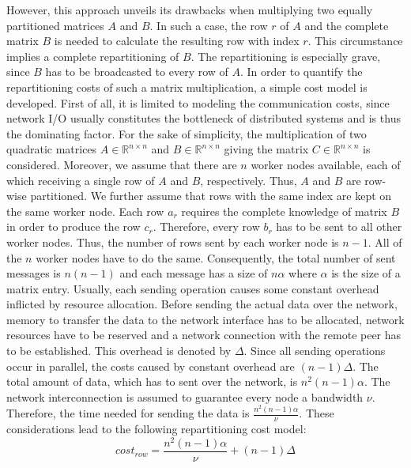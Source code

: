 However, this approach unveils its drawbacks when multiplying two equally partitioned matrices $A$ and $B$. In such a case, the row $r$ of $A$ and the complete matrix $B$ is needed to calculate the resulting row with index $r$. This circumstance implies a complete repartitioning of $B$. The repartitioning is especially grave, since $B$ has to be broadcasted to every row of $A$. In order to quantify the repartitioning costs of such a matrix multiplication, a simple cost model is developed. First of all, it is limited to modeling the communication costs, since network I/O usually constitutes the bottleneck of distributed systems and is thus the dominating factor. For the sake of simplicity, the multiplication of two quadratic matrices $A \in \mathbb{R}^{n\times n}$ and $B \in \mathbb{R}^{n\times n}$ giving the matrix $C\in \mathbb{R}^{n \times n}$ is considered. Moreover, we assume that there are $n$ worker nodes available, each of which receiving a single row of $A$ and $B$, respectively. Thus, $A$ and $B$ are row-wise partitioned. We further assume that rows with the same index are kept on the same worker node. Each row $a_r$ requires the complete knowledge of matrix $B$ in order to produce the row $c_r$. Therefore, every row $b_r$ has to be sent to all other worker nodes. Thus, the number of rows sent by each worker node is $n-1$. All of the $n$ worker nodes have to do the same. Consequently, the total number of sent messages is $n(n-1)$ and each message has a size of $n\alpha$ where $\alpha$ is the size of a matrix entry. Usually, each sending operation causes some constant overhead inflicted by resource allocation. Before sending the actual data over the network, memory to transfer the data to the network interface has to be allocated, network resources have to be reserved and a network connection with the remote peer has to be established. This overhead is denoted by $\Delta$. Since all sending operations occur in parallel, the costs caused by constant overhead are $(n-1)\Delta$. The total amount of data, which has to sent over the network, is $n^2(n-1)\alpha$. The network interconnection is assumed to guarantee every node a bandwidth $\nu$. Therefore, the time needed for sending the data is $\frac{n^2(n-1)\alpha}{\nu}$. These considerations lead to the following repartitioning cost model:
\begin{displaymath}
	cost_{row} = \frac{n^2(n-1)\alpha}{\nu} + (n-1)\Delta
\end{displaymath}
